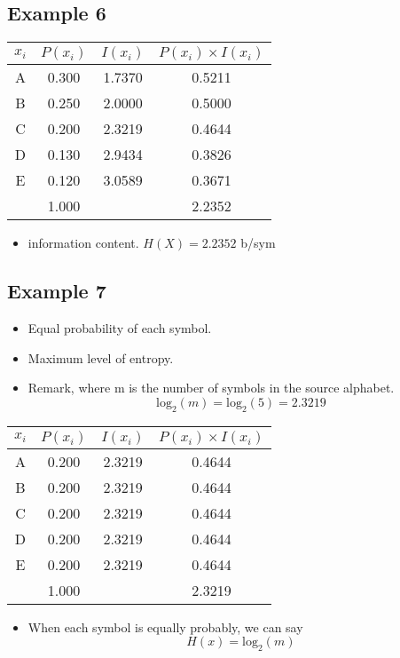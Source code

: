 \documentclass[a4paper,12pt]{article}
\begin{document}
					\subsection*{Example 6}
					\begin{center}\begin{tabular}{|c||c|c|c|}
							\hline\phantom{spa}  $x_i$	\phantom{spa} &	\phantom{spa}$P(x_i)$	\phantom{spa}&		\phantom{spa}$I(x_i)$\phantom{spa}&		$P(x_i) \times I(x_i)$	\\ \hline	\hline
							A	&	0.300	&	1.7370	&	0.5211	\\ \hline	
							B	&	0.250	&	2.0000	&	0.5000	\\ \hline	
							C	&	0.200	&	2.3219	&	0.4644	\\ \hline	
							D	&	0.130	&	2.9434	&	0.3826	\\ \hline	
							E	&	0.120	&	3.0589	&	0.3671	\\ \hline		\hline
							&	1.000	&		&	2.2352	\\ \hline	
						\end{tabular}  \end{center}
						\begin{itemize}
							\item information content. $H(X) = 2.2352 $ b/sym
						\end{itemize}
						\newpage
						\subsection*{Example 7}
						\begin{itemize}
							\item Equal probability of each symbol.
							\item Maximum level of entropy.
							\item Remark, where m is the number of symbols in the source alphabet.
							\[\mbox{log}_2(m) = \mbox{log}_2(5) = 2.3219 \]
						\end{itemize}
						\begin{center}\begin{tabular}{|c||c|c|c|}
								\hline
								\phantom{spa}  $x_i$	\phantom{spa} &	\phantom{spa}$P(x_i)$	\phantom{spa}&		\phantom{spa}$I(x_i)$\phantom{spa}&		$P(x_i) \times I(x_i)$	\\ \hline	\hline
								A	&	0.200	&	2.3219	&	0.4644	\\ \hline	
								B	&	0.200	&	2.3219	&	0.4644	\\ \hline	
								C	&	0.200	&	2.3219	&	0.4644	\\ \hline	
								D	&	0.200	&	2.3219	&	0.4644	\\ \hline	
								E	&	0.200	&	2.3219	&	0.4644	\\ \hline 	\hline	
								&	1.000	&		&	2.3219	\\ \hline
							\end{tabular}  \end{center}
							\begin{itemize}
								\item When each symbol is equally probably, we can say
								\[H(x) = \mbox{log}_2(m) \]
							\end{itemize}
						
\end{document}
